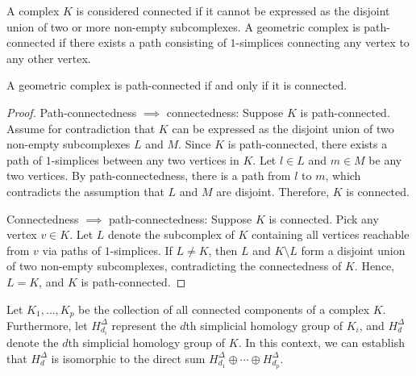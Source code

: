 \begin{definition}
	A complex $K$ is considered connected if it cannot be expressed as the disjoint
	union of two or more non-empty subcomplexes. A geometric complex is path-connected
	if there exists a path consisting of $1$-simplices connecting any vertex to
	any other vertex.
\end{definition}

\begin{lemma}
	\label{pathconnect} A geometric complex is path-connected if and only if it is
	connected.
\end{lemma}

\begin{proof}
	Path-connectedness $\implies$ connectedness: Suppose $K$ is path-connected. Assume
	for contradiction that $K$ can be expressed as the disjoint union of two non-empty
	subcomplexes $L$ and $M$. Since $K$ is path-connected, there exists a path of $1$-simplices
	between any two vertices in $K$. Let $l \in L$ and $m \in M$ be any two
	vertices. By path-connectedness, there is a path from $l$ to $m$, which contradicts
	the assumption that $L$ and $M$ are disjoint. Therefore, $K$ is connected.

	Connectedness $\implies$ path-connectedness: Suppose $K$ is connected. Pick any
	vertex $v \in K$. Let $L$ denote the subcomplex of $K$ containing all vertices
	reachable from $v$ via paths of $1$-simplices. If $L \neq K$, then $L$ and
	$K \setminus L$ form a disjoint union of two non-empty subcomplexes, contradicting
	the connectedness of $K$. Hence, $L = K$, and $K$ is path-connected.
\end{proof}

\begin{theorem}
	\label{decomptheorem} Let $K_{1}, \ldots, K_{p}$ be the collection of all connected
	components of a complex $K$. Furthermore, let $H^{\Delta}_{d_i}$ represent the
	$d$th simplicial homology group of $K_{i}$, and $H^{\Delta}_{d}$ denote the $d$th
	simplicial homology group of $K$. In this context, we can establish that
	$H^{\Delta}_{d}$ is isomorphic to the direct sum
	$H^{\Delta}_{d_1}\oplus \cdots \oplus H^{\Delta}_{d_p}$.
\end{theorem}

